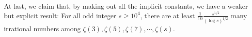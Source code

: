 \documentclass[11pt]{amsart}
\newtheorem{definition}[theorem]{Definition}
\numberwithin{equation}{section}
\begin{document}
At last, we claim that, by making out all the implicit constants, we have a weaker but explicit result: For all odd integer $s \geqslant 10^4$, there are at least $\frac{1}{10} \frac{s^{1/2}}{(\log s)^{1/2}}$ many irrational numbers among $\zeta(3),\zeta(5),\zeta(7),\cdots,\zeta(s)$.
\bigskip




\end{document}
